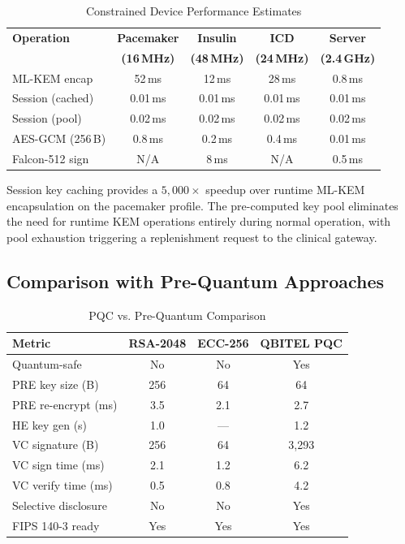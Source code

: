 \documentclass[conference,10pt]{IEEEtran}
\newcommand{\mlkem}{\textsf{ML-KEM}}
\begin{document}
\begin{table}[htbp]
\centering
\caption{Constrained Device Performance Estimates}
\label{tab:device_perf}
\begin{tabular}{@{}lcccc@{}}
\toprule
\textbf{Operation} & \textbf{Pacemaker} & \textbf{Insulin} & \textbf{ICD} & \textbf{Server} \\
 & \textbf{(16\,MHz)} & \textbf{(48\,MHz)} & \textbf{(24\,MHz)} & \textbf{(2.4\,GHz)} \\
\midrule
\mlkem{} encap & 52\,ms & 12\,ms & 28\,ms & 0.8\,ms \\
Session (cached) & 0.01\,ms & 0.01\,ms & 0.01\,ms & 0.01\,ms \\
Session (pool) & 0.02\,ms & 0.02\,ms & 0.02\,ms & 0.02\,ms \\
AES-GCM (256\,B) & 0.8\,ms & 0.2\,ms & 0.4\,ms & 0.01\,ms \\
Falcon-512 sign & N/A & 8\,ms & N/A & 0.5\,ms \\
\bottomrule
\end{tabular}
\end{table}

Session key caching provides a $5{,}000\times$ speedup over runtime \mlkem{} encapsulation on the pacemaker profile. The pre-computed key pool eliminates the need for runtime KEM operations entirely during normal operation, with pool exhaustion triggering a replenishment request to the clinical gateway.

\subsection{Comparison with Pre-Quantum Approaches}

\begin{table}[htbp]
\centering
\caption{PQC vs. Pre-Quantum Comparison}
\label{tab:comparison}
\begin{tabular}{@{}lccc@{}}
\toprule
\textbf{Metric} & \textbf{RSA-2048} & \textbf{ECC-256} & \textbf{QBITEL PQC} \\
\midrule
Quantum-safe & No & No & Yes \\
PRE key size (B) & 256 & 64 & 64 \\
PRE re-encrypt (ms) & 3.5 & 2.1 & 2.7 \\
HE key gen (s) & 1.0 & --- & 1.2 \\
VC signature (B) & 256 & 64 & 3{,}293 \\
VC sign time (ms) & 2.1 & 1.2 & 6.2 \\
VC verify time (ms) & 0.5 & 0.8 & 4.2 \\
Selective disclosure & No & No & Yes \\
FIPS 140-3 ready & Yes & Yes & Yes \\
\bottomrule
\end{tabular}
\end{table}
\end{document}

